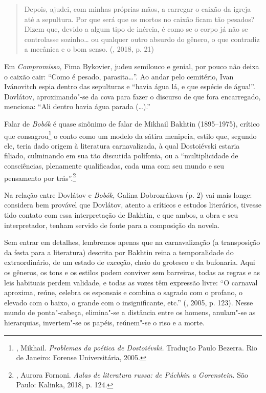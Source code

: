 \begin{quotation}
Depois, ajudei, com minhas próprias mãos, a carregar o caixão da igreja
até a sepultura. Por que será que os mortos no caixão ficam tão pesados?
Dizem que, devido a algum tipo de inércia, é como se o corpo já não se
controlasse sozinho\ldots{} ou qualquer outro absurdo do gênero, o que
contradiz a mecânica e o bom senso.
{}(, 2018, p. 21)
\end{quotation}

Em \emph{Compromisso,} Fima Bykovier, judeu semilouco e genial, por
pouco não deixa o caixão cair: ``Como é pesado, parasita\ldots{}''. Ao andar
pelo cemitério, Ivan Ivánovitch espia dentro das sepulturas e ``havia
água lá, e que espécie de água!''. Dovlátov, aproximando"-se da cova para
fazer o discurso de que fora encarregado, menciona: ``Ali dentro havia
água parada (\ldots{}).''

Falar de \emph{Bobók} é quase sinônimo de falar de Mikhail Bakhtin
(1895--1975), crítico que consagrou\footnote{, Mikhail.
  \emph{Problemas da poética de Dostoiévski.} Tradução Paulo Bezerra.
  Rio de Janeiro: Forense Universitária, 2005.} o conto como um modelo
da sátira menipeia, estilo que, segundo ele, teria dado origem à
literatura carnavalizada, à qual Dostoiévski estaria filiado, culminando
em sua tão discutida polifonia, ou a ``multiplicidade de consciências,
plenamente qualificadas, cada uma com seu mundo e seu pensamento por
trás''.\footnote{, Aurora Fornoni. \emph{Aulas de literatura
  russa: de Púchkin a Gorenstein.} São Paulo: Kalinka, 2018, p. 124.}

Na relação entre Dovlátov e \emph{Bobók,} Galina Dobrozrákova (p. 2) vai
mais longe: considera bem provável que Dovlátov, atento a críticos e
estudos literários, tivesse tido contato com essa interpretação de Bakhtin, e
que ambos, a obra e seu interpretador, tenham servido de fonte para a
composição da novela.

Sem entrar em detalhes, lembremos apenas que na carnavalização (a
transposição da festa para a literatura) descrita por Bakhtin reina a
temporalidade do extraordinário, de um estado de exceção, cheio do
grotesco e da bufonaria. Aqui os gêneros, os tons e os estilos podem
conviver sem barreiras, todas as regras e as leis habituais perdem
validade, e todas as vozes têm expressão livre: ``O carnaval aproxima,
reúne, celebra os esponsais e combina o sagrado com o profano, o elevado
com o baixo, o grande com o insignificante, etc.'' (, 2005, p.
123). Nesse mundo de ponta"-cabeça, elimina"-se a distância entre os
homens, anulam"-se as hierarquias, invertem"-se os papéis, reúnem"-se o
riso e a morte.

